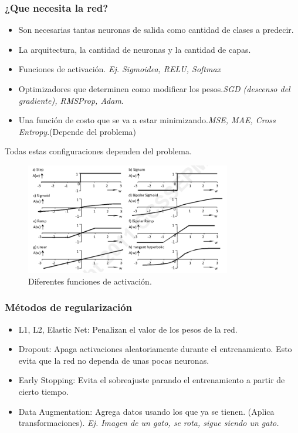 \documentclass[titlepage,a4paper]{article}
\begin{document}
\subsubsection*{¿Que necesita la red?}
\begin{itemize}
    \item Son necesarias tantas neuronas de salida como cantidad de clases a predecir.
    \item La arquitectura, la cantidad de neuronas y la cantidad de capas.
    \item Funciones de activación. \textit{Ej. Sigmoidea, RELU, Softmax}
    \item Optimizadores que determinen como modificar los pesos.\textit{SGD (descenso del gradiente), RMSProp, Adam}.
    \item Una función de costo que se va a estar minimizando.\textit{MSE, MAE, Cross Entropy}.(Depende del problema)
\end{itemize}

Todas estas configuraciones dependen del problema. 

\begin{figure}[!htb]
    \centering
    \includegraphics[width=0.8\textwidth]{imagenesResumen/FuncionesActivacion.png}
    \caption{Diferentes funciones de activación.}
\end{figure}

\subsubsection*{Métodos de regularización}
\begin{itemize}
    \item L1, L2, Elastic Net: Penalizan el valor de los pesos de la red.
    \item Dropout: Apaga activaciones aleatoriamente durante el entrenamiento. Esto evita que la red no dependa de unas pocas neuronas.
    \item Early Stopping: Evita el sobreajuste parando el entrenamiento a partir de cierto tiempo.
    \item Data Augmentation: Agrega datos usando los que ya se tienen. (Aplica transformaciones). \textit{Ej. Imagen de un gato, se rota, sigue siendo un gato.}
\end{itemize}
\end{document}
